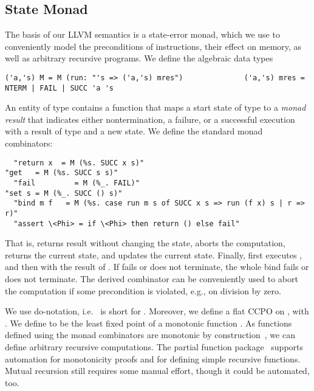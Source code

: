 \documentclass[a4paper,oribibl,envcountsame]{llncs}
\begin{document}
\subsection{State Monad}
The basis of our LLVM semantics is a state-error monad, which we use to conveniently model the preconditions of instructions, their effect 
on memory, as well as arbitrary recursive programs. We define the algebraic data types
\begin{lstlisting}
('a,'s) M = M (run: "'s => ('a,'s) mres")              ('a,'s) mres = NTERM | FAIL | SUCC 'a 's
\end{lstlisting}
An entity of type  contains a function  that maps a start state of type  to 
a \emph{monad result} that indicates either nontermination, a failure, or a successful execution with a result of type  and a new state.
We define the standard monad combinators:
\begin{lstlisting}
  "return x  = M (%s. SUCC x s)"                                           "get   = M (%s. SUCC s s)"
  "fail         = M (%_. FAIL)"                                                  "set s = M (%_. SUCC () s)"
  "bind m f   = M (%s. case run m s of SUCC x s => run (f x) s | r => r)"
  "assert \<Phi> = if \<Phi> then return () else fail"
\end{lstlisting}
That is,  returns result  without changing the state,  aborts the computation,
 returns the current state, and  updates the current state.
Finally,  first executes , and then  with the result of .
If  fails or does not terminate, the whole bind fails or does not terminate.  
The derived  combinator can be conveniently used to abort the computation 
if some precondition is violated, e.g., on division by zero.

We use do-notation, i.e.\  is short for .
Moreover, we define a flat CCPO\cite{Mark76} on , with .
We define  to be the least fixed point of a monotonic function .
As functions defined using the monad combinators are monotonic by construction~\cite{Kr10}, 
we can define arbitrary recursive computations. The partial function package~\cite{Kr10} supports automation for monotonicity 
proofs and for defining simple recursive functions. Mutual recursion still requires some manual effort, though it could be automated, too.
\end{document}
